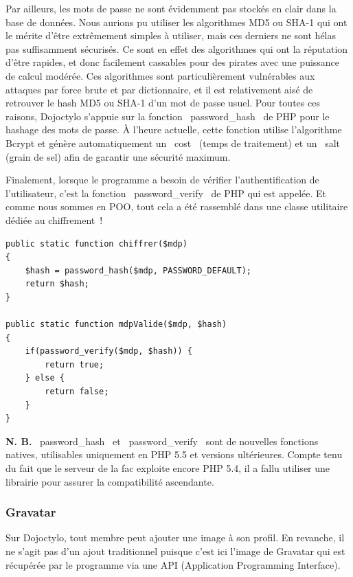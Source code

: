 \documentclass[a4paper,12pt]{article}
\begin{document}
Par ailleurs, les mots de passe ne sont évidemment pas stockés en clair dans la base de données. Nous aurions pu utiliser les algorithmes MD5 ou SHA-1 qui ont le mérite d'être extrêmement simples à utiliser, mais ces derniers ne sont hélas pas suffisamment sécurisés. Ce sont en effet des algorithmes qui ont la réputation d'être rapides, et donc facilement cassables pour des pirates avec une puissance de calcul modérée. Ces algorithmes sont particulièrement vulnérables aux attaques par force brute et par dictionnaire, et il est relativement aisé de retrouver le hash MD5 ou SHA-1 d'un mot de passe usuel. Pour toutes ces raisons, Dojoctylo s'appuie sur la fonction \og~password\_hash~\fg{} de PHP pour le hashage des mots de passe. À l'heure actuelle, cette fonction utilise l'algorithme Bcrypt et génère automatiquement un \og~cost~\fg{} (temps de traitement) et un \og~salt~\fg{} (grain de sel) afin de garantir une sécurité maximum.

Finalement, lorsque le programme a besoin de vérifier l'authentification de l'utilisateur, c'est la fonction \og~password\_verify~\fg{} de PHP qui est appelée. Et comme nous sommes en POO, tout cela a été rassemblé dans une classe utilitaire dédiée au chiffrement~!

\begin{lstlisting}
public static function chiffrer($mdp)
{
    $hash = password_hash($mdp, PASSWORD_DEFAULT);
    return $hash;
}

public static function mdpValide($mdp, $hash)
{
    if(password_verify($mdp, $hash)) {
        return true;
    } else {
        return false;
    }
}
\end{lstlisting}


\textbf{N. B.} \og~password\_hash~\fg{} et \og~password\_verify~\fg{} sont de nouvelles fonctions natives, utilisables uniquement en PHP 5.5 et versions ultérieures. Compte tenu du fait que le serveur de la fac exploite encore PHP 5.4, il a fallu utiliser une librairie pour assurer la compatibilité ascendante.

\subsubsection{Gravatar}

Sur Dojoctylo, tout membre peut ajouter une image à son profil. En revanche, il ne s'agit pas d'un ajout traditionnel puisque c'est ici l'image de Gravatar qui est récupérée par le programme via une API (Application Programming Interface).
\end{document}
